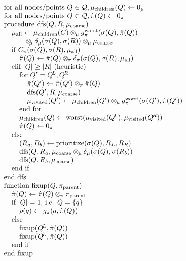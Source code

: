 \documentclass[times, 10pt,twocolumn]{article}
\DeclareMathOperator*{\worst}{worst}
\DeclareMathOperator{\dfs}{dfs}
\newcommand{\wholeQ}{\mathcal{Q}}
\newcommand{\x}{\hspace{0.15in}}
\newcommand{\xx}{\hspace{0.3in}}
\newcommand{\xxx}{\hspace{0.45in}}
\newcommand{\kdleft}{\hspace{-0.02in}^L}
\newcommand{\kdright}{\hspace{-0.02in}^R}
\newcommand{\myop}[1]{\otimes\hspace{-0.04in}_{#1}\hspace{0.03in}}
\newcommand{\allpi}{\pi}
\newcommand{\oppi}{\myop{\allpi}}
\newcommand{\gpi}{g_{\allpi}}
\newcommand{\canprunepi}{C_{\allpi}}
\newcommand{\deltapi}{\delta_{\allpi}}
\newcommand{\gpiworst}{g_{\allpi}^{\worst}}
\newcommand{\allrho}{\rho}
\newcommand{\allmu}{\mu}
\newcommand{\opmu}{\myop{\mu}}
\newcommand{\deltamu}{\delta_{\mu}}
\newcommand{\muparent}{\allmu_{\text{coarse}}}
\newcommand{\muchild}{\allmu_{\text{children}}}
\newcommand{\muvisit}{\allmu_{\text{visited}}}
\newcommand{\muall}{\allmu_{\text{all}}}
\newcommand{\hatpi}{\hat{\allpi}}
\newcommand{\piparent}{\allpi_{\text{parent}}}
\newcommand{\allsigma}{\sigma}
\begin{document}
\begin{equation*}
  \begin{array}{l}
    \text{for all nodes/points } Q \in \wholeQ, \muchild(Q) \gets 0_{\allmu}
    \\
    \text{for all nodes/points } Q \in \wholeQ, \hatpi(Q) \gets 0_{\allpi}
    \\
    \mbox{procedure dfs}(Q, R, \muparent)
    \\
    \x \muall \gets \muchild(C) \opmu \gpiworst(\allsigma(Q), \hatpi(Q))
    \\ \x \qquad \opmu \deltamu(\allsigma(Q), \allsigma(R)) \opmu \muparent
    \\
    \x \text{if } \canprunepi(\allsigma(Q), \allsigma(R), \muall)
    \\
    \xx \hatpi(Q) \gets \hatpi(Q) \oppi \deltapi(\allsigma(Q), \allsigma(R), \muall)
    \\
    \x \text{elif } |Q| \geq |R| \text{ (heuristic)}
    \\
    \xx \text{for } Q' = Q\kdleft, Q\kdright
    \\
    \xxx \hatpi(Q') \gets \hatpi(Q') \oppi \hatpi(Q)
    \\
    \xxx \text{dfs}(Q', R, \muparent)
    \\
    \xxx \muvisit(Q') \gets \muchild(Q') \opmu \gpiworst(\sigma(Q'), \hatpi(Q'))
    \\
    \xx \text{end for}
    \\
    \xx \muchild(Q) \gets \worst(\muvisit(Q\kdleft), \muvisit(Q\kdright))
    \\
    \xx \hatpi(Q) \gets 0_{\allpi}
    \\
    \x \mbox{else}
    \\
    \xx (R_a, R_b) \gets \mbox{prioritize}(\allsigma(Q), R_L, R_R)
    \\
    \xx \dfs(Q, R_a, \muparent \opmu \deltamu(\allsigma(Q), \allsigma(R_b))
    \\
    \xx \dfs(Q, R_b, \muparent)
    \\
    \x \text{end if}
    \\
    \text{end dfs}
    \\
    \text{function fixup}(Q, \piparent)
    \\
    \x \hatpi(Q) \gets \hatpi(Q) \oppi \piparent
    \\
    \x \text{if } |Q| = 1 \text{, i.e. } Q = \{q\}
    \\
    \xx \allrho(q) \gets \gpi(q, \hatpi(Q))
    \\
    \x \text{else}
    \\
    \xx \text{fixup}(Q\kdleft, \hatpi(Q))
    \\
    \xx \text{fixup}(Q\kdleft, \hatpi(Q))
    \\
    \x \mbox{end if}
    \\
    \mbox{end fixup}
  \end{array}
\end{equation*}
\end{document}
